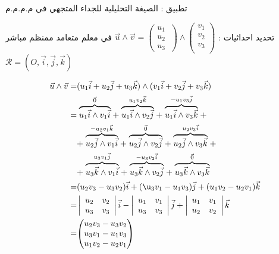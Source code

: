 \begin{frame}[allowframebreaks]{تطبيق :
	الصيغة التحليلية للجداء المتجهي في م.م.م.م }

\begin{block}{}
	

	تحديد احداثيات :
$ 	  \vec{u}\wedge \vec{v}= \begin{pmatrix}u_{1}\\u_{2}\\u_{3}\
\end{pmatrix}\land   \begin{pmatrix}v_{1}\\v_{2}\\v_{3}\\	\end{pmatrix} $
في معلم متعامد ممنظم مباشر  $\mathcal{R}=(O,\vec{i},\vec{j},\vec{k})$

\end{block}
\begin{small}


		\begin{align*}
	\displaystyle \vec{u}\wedge \vec{v}=& (u_{1}\vec{i}+u_{2}\vec{j}+u_{3}\vec{k})
\land  (v_{1}\vec{i}+v_{2}\vec{j}+v_{3}\vec{k})\\
	=&\stackrel{\vec{ 0}}{\overbrace{u_{1}\vec{i}\land v_{1}\vec{i}}} +\stackrel{u_{1}v_{2}\vec{ k}}{\overbrace{u_{1}\vec{i}\land v_{2}\vec{j}}}+\stackrel{-u_{1}v_{3}\vec{j}}{\overbrace{u_{1}\vec{i}\land v_{3}\vec{k}}}+\\
	 &+\stackrel{-u_{2}v_{1}\vec{ k}}{\overbrace{u_{2}\vec{j}\land v_{1}\vec{i}}} +\stackrel{\vec{ 0}}{\overbrace{u_{2}\vec{j}\land v_{2}\vec{j}}}+\stackrel{u_{2}v_{3}\vec{ i}}{\overbrace{u_{2}\vec{j}\land v_{3}\vec{k}}}+\\	
	 &+\stackrel{u_{3}v_{1}\vec{ j}}{\overbrace{u_{3}\vec{k}\land v_{1}\vec{i}}} +\stackrel{-u_{3}v_{2}\vec{ i}}{\overbrace{u_{3}\vec{k}\land v_{2}\vec{j}}}+\stackrel{\vec{ 0}}{\overbrace{u_{3}\vec{k}\land v_{3}\vec{k}}}\\
	=&{(u_{2}v_{3}-u_{3}v_{2})\vec{i}+(\u_{3}v_{1}-u_{1}v_{3})\vec{j}+(u_{1}v_{2}-u_{2}v_{1})\vec{k}}	\\
%	
	=&\left |\begin{array}{cc} u_{2}&v_{2}\\u_{3}&v_{3}\end{array}\right |\vec{i}- \left |\begin{array}{cc}u_{1}&v_{1}\\u_{3}&v_{3}\end{array}\right |\vec{j}+ \left |\begin{array}{cc}  u_{1}&v_{1} \\u_{2}&v_{2}\end{array}\right |\vec{k} \\
	=&{\begin{pmatrix}u_{2}v_{3}-u_{3}v_{2}\\u_{3}v_{1}-u_{1}v_{3}\\u_{1}v_{2}-u_{2}v_{1}\end{pmatrix}}		
	\end{align*}
\end{small}
\end{frame}